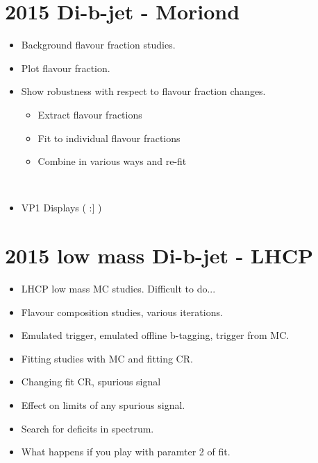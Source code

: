\section{2015 Di-b-jet - Moriond}
\begin{itemize}
\item{Background flavour fraction studies.}
\item{Plot flavour fraction.}
\item{Show robustness with respect to flavour fraction changes.}  
  \begin{itemize}[label={$-$}]
  \item{Extract flavour fractions}
  \item{Fit to individual flavour fractions}
  \item{Combine in various ways and re-fit}
  \end{itemize}
\\
\item{VP1 Displays ( :] )}
\end{itemize}

\section{2015 low mass Di-b-jet - LHCP}

\begin{itemize}
\item{LHCP low mass MC studies. Difficult to do...}
\item{Flavour composition studies, various iterations.}
\item{Emulated trigger, emulated offline b-tagging, trigger from MC.}
\end{itemize}

\begin{itemize}
\item{Fitting studies with MC and fitting CR.}
\item{Changing fit CR, spurious signal}
\\
\item{Effect on limits of any spurious signal.}
\item{Search for deficits in spectrum.}
\item{What happens if you play with paramter 2 of fit.}
\\
\end{itemize}

